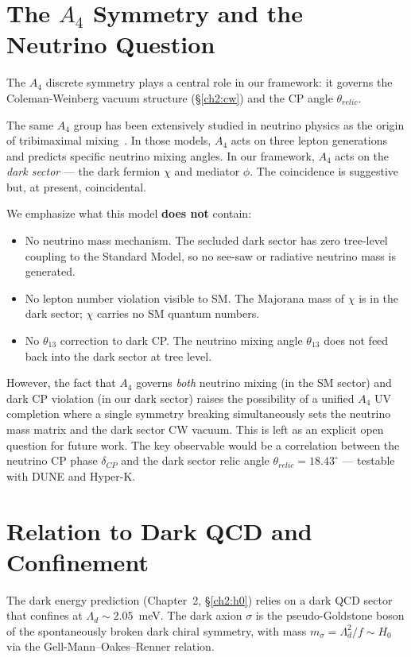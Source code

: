 \section{The \texorpdfstring{$A_4$}{A4} Symmetry and the Neutrino Question}
\label{disc:neutrino}

The $A_4$ discrete symmetry plays a central role in our framework: it governs
the Coleman-Weinberg vacuum structure (§\ref{ch2:cw}) and the CP angle
$\theta_{relic}$.

The same $A_4$ group has been extensively studied in neutrino physics as the
origin of tribimaximal mixing~\cite{Ma2001,AltarelliFeruglio2005}. In those
models, $A_4$ acts on three lepton generations and predicts specific neutrino
mixing angles. In our framework, $A_4$ acts on the \emph{dark sector} — the
dark fermion $\chi$ and mediator $\phi$. The coincidence is suggestive but,
at present, coincidental.

We emphasize what this model \textbf{does not} contain:
\begin{itemize}
\item No neutrino mass mechanism. The secluded dark sector has zero tree-level
      coupling to the Standard Model, so no see-saw or radiative neutrino
      mass is generated.
\item No lepton number violation visible to SM. The Majorana mass of $\chi$
      is in the dark sector; $\chi$ carries no SM quantum numbers.
\item No $\theta_{13}$ correction to dark CP. The neutrino mixing angle
      $\theta_{13}$ does not feed back into the dark sector at tree level.
\end{itemize}

However, the fact that $A_4$ governs \emph{both} neutrino mixing (in the SM
sector) and dark CP violation (in our dark sector) raises the possibility of
a unified $A_4$ UV completion where a single symmetry breaking simultaneously
sets the neutrino mass matrix and the dark sector CW vacuum. This is left
as an explicit open question for future work. The key observable would be a
correlation between the neutrino CP phase $\delta_{CP}$ and the dark sector
relic angle $\theta_{relic} = 18.43^\circ$ — testable with DUNE and Hyper-K.


\section{Relation to Dark QCD and Confinement}
\label{disc:darkqcd}

The dark energy prediction (Chapter~2, §\ref{ch2:h0}) relies on a dark QCD
sector that confines at $\Lambda_d \sim 2.05$~meV. The dark axion $\sigma$ is
the pseudo-Goldstone boson of the spontaneously broken dark chiral symmetry,
with mass $m_\sigma = \Lambda_d^2/f \sim H_0$ via the Gell-Mann--Oakes--Renner
relation.

